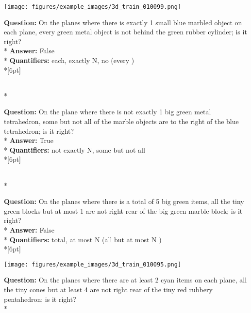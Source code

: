 \begin{figure*}  
\begin{minipage}{0.48\textwidth}
    \texttt{[image: figures/example\_images/3d\_train\_010099.png]}
    \begin{minipage}[t][2.2cm][t]{1\textwidth}
      \footnotesize
      \textbf{Question:} On the planes where there is exactly 1 small blue marbled object on each plane, every green metal object is not behind the green rubber cylinder; is it right? \\*
      \textbf{Answer:}  False \\*
      \textbf{Quantifiers:}  each, exactly N, no (every )\\*[6pt]
    \end{minipage}\\*
    \begin{minipage}[t][2.2cm][t]{1\textwidth}
      \footnotesize
      \textbf{Question:} On the plane where there is not exactly 1 big green metal tetrahedron, some but not all of the marble objects are to the right of the blue tetrahedron; is it right? \\*
      \textbf{Answer:} True \\*
      \textbf{Quantifiers:}  not exactly N, some but not all\\*[6pt]
    \end{minipage}\\*
    \begin{minipage}[t][2.2cm][t]{1\textwidth}
      \footnotesize
      \textbf{Question:} On the planes where there is a total of 5 big green items, all the tiny green blocks but at most 1 are not right rear of the big green marble block; is it right? \\*
      \textbf{Answer:} False \\*
      \textbf{Quantifiers:} total, at most N (all but at most N ) \\*[6pt]
    \end{minipage}
  \end{minipage}
  \hspace{3.5mm}
  \begin{minipage}{0.48\textwidth}
    \texttt{[image: figures/example\_images/3d\_train\_010095.png]}
    \begin{minipage}[t][2.2cm][t]{1\textwidth}
      \footnotesize
      \textbf{Question:}  On the planes where there are at least 2 cyan items on each plane, all the tiny cones but at least 4 are not right rear of the tiny red rubbery pentahedron; is it right? \\*

\end{minipage}
\end{minipage}
\end{figure*}

